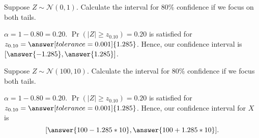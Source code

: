 \documentclass{ximera}
\begin{document}
\begin{problem}
Suppose $Z\sim \mathcal N(0,1)$. Calculate the interval for $80\%$ confidence if we focus on both tails. 
\begin{explanation}
$\alpha=1-0.80=0.20$.
$\Pr(|Z|\geq z_{0.10})=0.20$ is satisfied for $z_{0.10}=\answer[tolerance=0.001]{1.285}$. Hence, our confidence interval is $[\answer{-1.285},\answer{1.285}]$. 

\end{explanation}
\end{problem}


\begin{problem}
Suppose $Z\sim \mathcal N(100,10)$. Calculate the interval for $80\%$ confidence if we focus both tails. 
\begin{explanation}
$\alpha=1-0.80=0.20$.
$\Pr(|Z|\geq z_{0.10})=0.20$ is satisfied for $z_{0.10}=\answer[tolerance=0.001]{1.285}$. Hence, our confidence interval  for $X$ is
$$[\answer{100-1.285*10},\answer{100+1.285*10}].$$

\end{explanation}
\end{problem}
\end{document}
